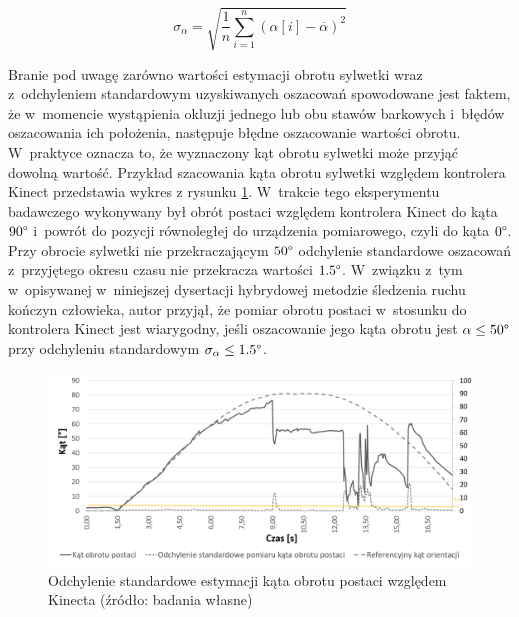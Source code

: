 \begin{equation}
	\sigma_\alpha = \sqrt{\frac{1}{n}\sum_{i=1}^{n}{(\alpha[i] - \overline{\alpha})^2}}
	\label{eq:stdDev}
\end{equation}
												
Branie pod uwagę zarówno wartości estymacji obrotu sylwetki wraz z~odchyleniem standardowym uzyskiwanych oszacowań spowodowane jest faktem, że w~momencie wystąpienia okluzji jednego lub obu stawów barkowych i~błędów oszacowania ich położenia, następuje błędne oszacowanie wartości obrotu. W~praktyce oznacza to, że wyznaczony kąt obrotu sylwetki może przyjąć dowolną wartość. Przykład szacowania kąta obrotu sylwetki względem kontrolera Kinect przedstawia wykres z rysunku \ref{fig:hybrid:kinect:kinectRotationVariance}. W~trakcie tego eksperymentu badawczego wykonywany był obrót postaci względem kontrolera Kinect do kąta $90\degree$ i~powrót do pozycji równoległej do urządzenia pomiarowego, czyli do kąta $0\degree$. Przy obrocie sylwetki nie przekraczającym $50\degree$ odchylenie standardowe oszacowań z~przyjętego okresu czasu nie przekracza wartości $1.5\degree$. W~związku z~tym w~opisywanej w~niniejszej dysertacji hybrydowej metodzie śledzenia ruchu kończyn człowieka, autor przyjął, że pomiar obrotu postaci w~stosunku do kontrolera Kinect jest wiarygodny, jeśli oszacowanie jego kąta obrotu jest $\alpha \le 50\degree$ przy odchyleniu standardowym $\sigma_\alpha\le 1.5 \degree$.
												
\begin{savenotes}
	\begin{figure}[!htb]
		\centering
		\includegraphics[width=\textwidth]{images/kinectRotationStdDev.png}
		\caption{Odchylenie standardowe estymacji kąta obrotu postaci względem Kinecta  (źródło: badania własne)}						
		\label{fig:hybrid:kinect:kinectRotationVariance}
	\end{figure}
\end{savenotes}
														
